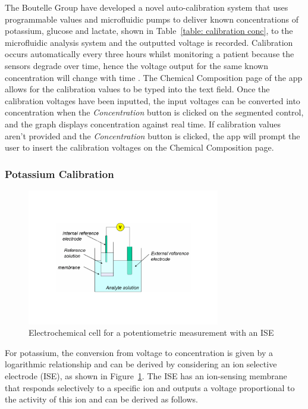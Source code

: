 The Boutelle Group have developed a novel auto-calibration system that uses programmable values and microfluidic pumps to deliver known concentrations of potassium, glucose and lactate, shown in Table~\ref{table: calibration conc}, to the microfluidic analysis system and the outputted voltage is recorded. Calibration occurs automatically every three hours whilst monitoring a patient because the sensors degrade over time, hence the voltage output for the same known concentration will change with time \cite{Rogers2017}. The Chemical Composition page of the app allows for the calibration values to be typed into the text field. Once the calibration voltages have been inputted, the input voltages can be converted into concentration when the \textit{Concentration} button is clicked on the segmented control, and the graph displays concentration against real time. If calibration values aren't provided and the \textit{Concentration} button is clicked, the app will prompt the user to insert the calibration voltages on the Chemical Composition page. 

\subsubsection{Potassium Calibration}

\begin{figure}[b!]
\centering
\includegraphics[trim={0cm 5cm 0cm  5cm}, clip, width=0.75\textwidth]{./figures/ISE.pdf}
\captionsetup{justification=centering}
\caption{Electrochemical cell for a potentiometric measurement with an ISE \cite{LibreTexts2019}}
\label{fig: ISE}
\end{figure}

For potassium, the conversion from voltage to concentration is given by a logarithmic relationship and can be derived by considering an ion selective electrode (ISE), as shown in Figure~\ref{fig: ISE}. The ISE has an ion-sensing membrane that responds selectively to a specific ion and outputs a voltage proportional to the activity of this ion \cite{Rogers2017, LibreTexts2019} and can be derived as follows. 

